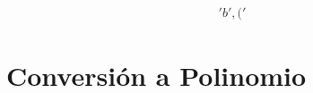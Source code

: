 \documentclass[10pt, a4paper]{article}
\begin{document}
\begin{align*}
'b', ('%
\end{align*}\part{Conversión a Polinomio}
\end{document}
